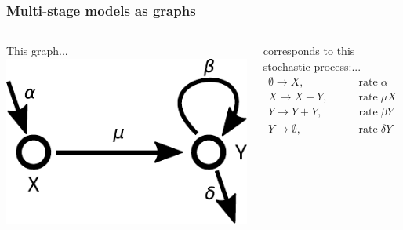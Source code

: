 \documentclass{beamer}
\begin{document}
\begin{frame}
    \frametitle{Multi-stage models as graphs}

    \begin{columns}
        \begin{column}{0.6\textwidth}
        This graph...
        \includegraphics[width=\textwidth]{figures/diagram1}
        \end{column}
        \begin{column}{0.4\textwidth}
        corresponds to this stochastic process:...
        \begin{align}
            \emptyset \rightarrow X, &\qquad \mathrm{rate\;}\alpha
            \nonumber \\
            X \rightarrow X + Y, &\qquad\mathrm{rate\;}\mu X
            \nonumber \\
            Y \rightarrow Y + Y, &\qquad\mathrm{rate\;} \beta Y
            \nonumber \\
            Y \rightarrow \emptyset, &\qquad\mathrm{rate\;} \delta Y
            \nonumber
        \end{align}
        \end{column}
    \end{columns}



\end{frame}
\end{document}
